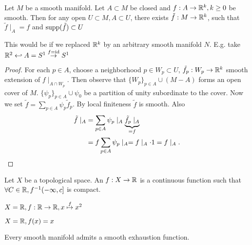 \begin{proposition}\label{prop:2.9}
    Let \(M\) be a smooth manifold. Let \(A\subset M\) be closed and \(f:A\to\mathbb{R}^k, k\geq 0\) be smooth.
    Then for any open \(U \subset M, A\subset U\), there exists \(\tilde{f}:M\to\mathbb{R}^k\), such that \(\tilde{f}\mid_{A}=f\) and \(\text{supp}(\tilde{f})\subset U\)
\end{proposition}

\begin{remark}
    This would be  if we replaced \(\mathbb{R}^k\) by an arbitrary smooth manifold \(N\). E.g. 
    take \(\mathbb{R}^2\hookleftarrow A=S^1\stackrel{f=\text{id}}{\to}S^1\)
\end{remark}

\begin{proof} %
    For each \(p\in A\), choose a neighborhood \(p\in W_p\subset U\), \(\tilde{f}_p:W_p\to\mathbb{R}^k\) smooth 
    extension of \(f\mid_{A\cap W_p}\). Then observe that \(\{W_p\}_{p\in A}\cup (M-A)\) forms an open cover of \(M\).
    \(\{\psi_p\}_{p\in A}\cup \psi_0\) be a partition of unity subordinate to the cover. Now we set 
    \(\tilde{f}=\sum_{p\in A}\psi_p \tilde{f}_p\). By local finiteness \(\tilde{f}\) is smooth. Also 
    \begin{align*}
        \tilde{f}\mid_A&=\sum_{p\in A} \psi_p\mid_A \underbrace{\tilde{f_p}\mid_A}_{=f}\\
        &=f\sum_{p\in A} \psi_p\mid_A = f\mid_A \cdot 1 = f\mid_A .\qedhere
    \end{align*}
\end{proof}

\begin{definition*}
    Let \(X\) be a topological space. An  \(f:X\to\mathbb{R}\) is a 
    continuous function such that \(\forall C\in \mathbb{R},f^{-1}(-\infty,c]\) is compact. 
\end{definition*}

\begin{example}
    \(X=\mathbb{R},f:\mathbb{R}\to\mathbb{R},x\stackrel{f}{\mapsto} x^2\)
\end{example}

\begin{example}
    \(X=\mathbb{R},f(x)=x\)
\end{example}

\begin{proposition}\label{prop:2.10}
    Every smooth manifold admits a smooth exhaustion function.
\end{proposition}

